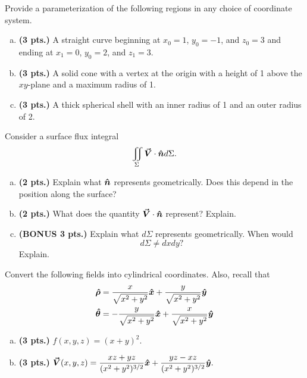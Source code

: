 \documentclass[12pt]{amsbook}
\newcommand{\vecfieldV}{\boldsymbol{\vec{V}}}
\newcommand{\thetahat}{\boldsymbol{\hat{\theta}}}
\newcommand{\rhohat}{\boldsymbol{\hat{\rho}}}
\begin{document}
\begin{problem}
Provide a parameterization of the following regions in any choice of coordinate system.
\begin{enumerate}[(a)]
    \item \textbf{(3 pts.)} A straight curve beginning at $x_0=1$, $y_0=-1$, and $z_0=3$ and ending at $x_1 = 0$, $y_0=2$, and $z_1=3$.
    \item \textbf{(3 pts.)} A solid cone with a vertex at the origin with a height of 1 above the $xy$-plane and a maximum radius of 1.
    \item \textbf{(3 pts.)} A thick spherical shell with an inner radius of 1 and an outer radius of 2.
\end{enumerate}
\end{problem}

\begin{problem}
Consider a surface flux integral
\[
    \iint_{\Sigma} \vecfieldV \cdot \unitvec d\Sigma.
\]
\begin{enumerate}[(a)]
    \item \textbf{(2 pts.)} Explain what $\boldsymbol{\hat{n}}$ represents geometrically. Does this depend in the position along the surface?
    \item \textbf{(2 pts.)} What does the quantity $\vecfieldV \cdot \unitvec$ represent? Explain.
    \item \textbf{(BONUS 3 pts.)} Explain what $d\Sigma$ represents geometrically. When would \[d\Sigma \neq dx dy?\] Explain.
\end{enumerate}
\end{problem}

\begin{problem}
Convert the following fields into cylindrical coordinates. Also, recall that
\begin{align*}
\rhohat &= \frac{x}{\sqrt{x^2+y^2}}\xhat + \frac{y}{\sqrt{x^2+y^2}}\yhat \\
\thetahat &= -\frac{y}{\sqrt{x^2+y^2}}\xhat + \frac{x}{\sqrt{x^2+y^2}}\yhat
\end{align*}
\begin{enumerate}[(a)]
    \item \textbf{(3 pts.)} $f(x,y,z)= (x+y)^2$.
    \item \textbf{(3 pts.)} $\displaystyle{\vecfieldV(x,y,z) = \frac{xz+yz}{(x^2+y^2)^{3/2}}\xhat + \frac{yz-xz}{(x^2+y^2)^{3/2}}}\yhat.$
\end{enumerate}
\end{problem}
\end{document}
